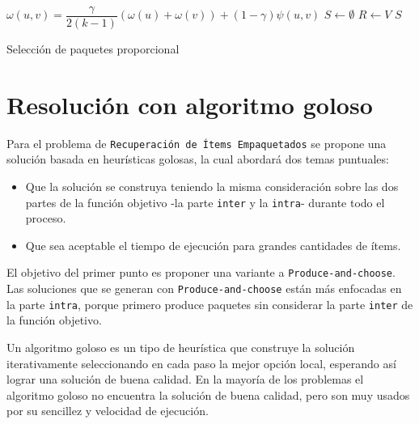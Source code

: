 \begin{center}
	\begin{algorithm}[H]
	\DontPrintSemicolon
	\SetAlgoLined
		$\omega(u,v) = \dfrac{\gamma}{2( k - 1)} (\omega(u) + \omega(v)) + (1 - \gamma)\psi(u,v)$\;
		$S \leftarrow \emptyset$\;
		$R \leftarrow V$\;
		\Return $S$\;
	\caption{Selección de paquetes proporcional}\label{alg:algSelProp}
	\end{algorithm}
\end{center}

\section{Resolución con algoritmo goloso}

Para el problema de \texttt{Recuperación de Ítems Empaquetados} se propone una solución basada en heurísticas golosas, la cual abordará dos temas puntuales:
\begin{itemize}
	\item Que la solución se construya teniendo la misma consideración sobre las dos partes de la función objetivo -la parte \texttt{inter} y la \texttt{intra}- durante todo el proceso.
	\item Que sea aceptable el tiempo de ejecución para grandes cantidades de ítems.
\end{itemize}

El objetivo del primer punto es proponer una variante a \texttt{Produce-and-choose}. Las soluciones que se generan con \texttt{Produce-and-choose} están más enfocadas en la parte \texttt{intra}, porque primero produce paquetes sin considerar la parte \texttt{inter} de la función objetivo.

Un algoritmo goloso es un tipo de heurística que construye la solución iterativamente seleccionando en cada paso la mejor opción local, esperando así lograr una solución de buena calidad. En la mayoría de los problemas el algoritmo goloso no encuentra la solución de buena calidad, pero son muy usados por su sencillez y velocidad de ejecución.

